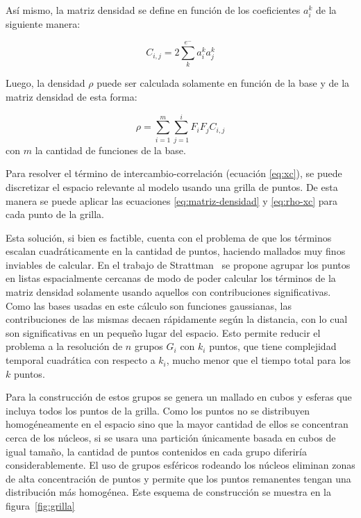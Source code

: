 As\'i mismo, la matriz densidad se define en funci\'on de los coeficientes $a^k_i$ de la siguiente manera:

\begin{equation}
  \label{eq:matriz-densidad}
  C_{i,j} = 2 \sum^{e^{-}}_k a^k_i a^k_j
\end{equation}

Luego, la densidad $\rho$ puede ser calculada solamente en funci\'on de la base y de la matriz densidad de esta forma:

\begin{equation}
  \label{eq:rho-xc}
  \rho = \sum^m_{i=1} \sum^i_{j=1} F_i F_j C_{i,j}
\end{equation}
con $m$ la cantidad de funciones de la base.

Para resolver el t\'ermino de intercambio-correlaci\'on (ecuaci\'on \ref{eq:xc}), se puede discretizar el espacio relevante al
modelo usando una grilla de puntos. De esta manera se puede aplicar las ecuaciones \ref{eq:matriz-densidad} y \ref{eq:rho-xc}
para cada punto de la grilla.

Esta soluci\'on, si bien es factible, cuenta con el problema de que los t\'erminos escalan cuadr\'aticamente
en la cantidad de puntos, haciendo mallados muy finos inviables de calcular. En el trabajo de Strattman~\cite{Stratmann} se
propone agrupar los puntos en listas espacialmente cercanas de modo de poder calcular los t\'erminos de la matriz densidad
solamente usando aquellos con contribuciones significativas. Como las bases usadas en este c\'alculo son funciones gaussianas,
las contribuciones de las mismas decaen r\'apidamente seg\'un la distancia, con lo cual son significativas en un peque\~no lugar del espacio. Esto permite
reducir el problema a la resoluci\'on de $n$ grupos $G_i$ con $k_i$ puntos, que tiene complejidad temporal cuadr\'atica con respecto a $k_i$,
mucho menor que el tiempo total para los $k$ puntos.

Para la construcci\'on de estos grupos se genera un mallado en cubos y esferas que incluya todos los puntos
de la grilla. Como los puntos no se distribuyen homog\'eneamente en el espacio sino que la mayor cantidad de ellos
se concentran cerca de los n\'ucleos, si se usara una partici\'on \'unicamente basada en cubos de igual tama\~no, la cantidad
de puntos contenidos en cada grupo diferir\'ia considerablemente. El uso de grupos esf\'ericos rodeando
los n\'ucleos eliminan zonas de alta concentraci\'on de puntos y permite que los puntos remanentes
tengan una distribuci\'on m\'as homog\'enea. Este esquema de construcci\'on se muestra en la figura~\ref{fig:grilla}

